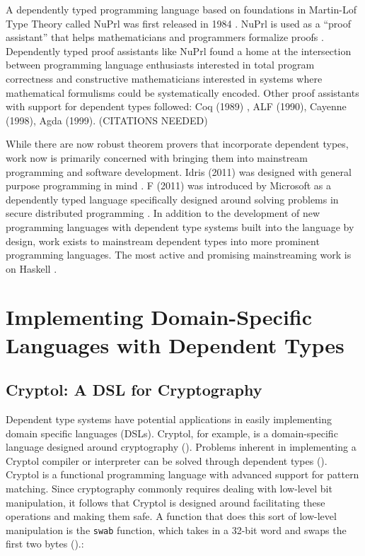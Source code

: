A dependently typed programming language based on foundations in Martin-Lof Type
Theory called NuPrl was first released in 1984 \cite{nuprl}. NuPrl is used as a
``proof assistant'' that helps mathematicians and programmers formalize proofs
\cite{prl_home}. Dependently typed proof assistants like NuPrl found a home at
the intersection between programming language enthusiasts interested in total
program correctness and constructive mathematicians interested in systems where
mathematical formulisms could be systematically encoded. Other proof assistants
with support for dependent types followed: Coq (1989) \cite{girard1989proofs},
ALF (1990), Cayenne (1998), Agda (1999). (CITATIONS NEEDED)

While there are now robust theorem provers that incorporate dependent types,
work now is primarily concerned with bringing them into mainstream programming
and software development. Idris (2011) was designed with general purpose
programming in mind \cite{tdd_book}. F\* (2011) was introduced by Microsoft as a
dependently typed language specifically designed around solving problems in
secure distributed programming \cite{fstar_distributed_programming}. In addition
to the development of new programming languages with dependent type systems
built into the language by design, work exists to mainstream dependent types
into more prominent programming languages. The most active and promising
mainstreaming work is on Haskell \cite{eisenberg2016, gundry2013}. 

\section{Implementing Domain-Specific Languages with Dependent Types}

\subsection{Cryptol: A DSL for Cryptography}

Dependent type systems have potential applications in easily implementing domain
specific languages (DSLs). Cryptol, for example, is a domain-specific language
designed around cryptography (\cite{cryptol_manual}). Problems inherent in
implementing a Cryptol compiler or interpreter can be solved through dependent
types (\cite{power_of_pi}). Cryptol is a functional programming language with
advanced support for pattern matching. Since cryptography commonly requires
dealing with low-level bit manipulation, it follows that Cryptol is designed
around facilitating these operations and making them safe. A function that does
this sort of low-level manipulation is the \texttt{swab} function, which takes
in a 32-bit word and swaps the first two bytes (\cite{cryptol_manual}).: 

